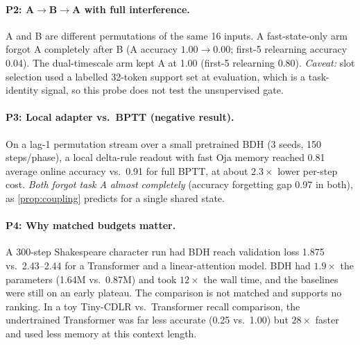 \documentclass[11pt]{article}
\theoremstyle{remark}
\newcommand{\cdlr}{\textsc{CDLR}}
\begin{document}
\paragraph{P2: A$\to$B$\to$A with full interference.} A and B are different permutations of the same 16 inputs.
A fast-state-only arm forgot A completely after B (A accuracy $1.00\to0.00$; first-5 relearning accuracy 0.04). The
dual-timescale arm kept A at 1.00 (first-5 relearning 0.80). \emph{Caveat:} slot selection used a labelled
32-token support set at evaluation, which is a task-identity signal, so this probe does not test the unsupervised
gate.

\paragraph{P3: Local adapter vs.\ BPTT (negative result).} On a lag-1 permutation stream over a small pretrained BDH
(3 seeds, 150 steps/phase), a local delta-rule readout with fast Oja memory reached 0.81 average online accuracy
vs.\ 0.91 for full BPTT, at about $2.3\times$ lower per-step cost. \emph{Both forgot task A almost completely}
(accuracy forgetting gap 0.97 in both), as \cref{prop:coupling} predicts for a single shared state.

\paragraph{P4: Why matched budgets matter.} A 300-step Shakespeare character run had BDH reach validation loss
1.875 vs.\ 2.43--2.44 for a Transformer and a linear-attention model. BDH had $1.9\times$ the parameters
(1.64M vs.\ 0.87M) and took $12\times$ the wall time, and the baselines were still on an early plateau. The
comparison is not matched and supports no ranking. In a toy Tiny-\cdlr{} vs.\ Transformer recall comparison, the
undertrained Transformer was far less accurate (0.25 vs.\ 1.00) but $28\times$ faster and used less memory at
this context length.
\end{document}
